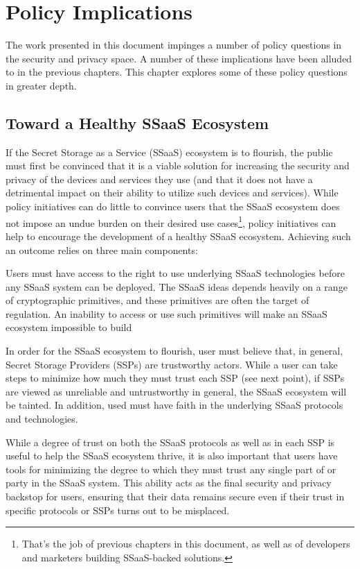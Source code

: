 \chapter{Policy Implications}
\label{chap:policy}

The work presented in this document impinges a number of policy
questions in the security and privacy space. A number of these
implications have been alluded to in the previous chapters. This
chapter explores some of these policy questions in greater depth.

\section{Toward a Healthy SSaaS Ecosystem}

If the Secret Storage as a Service (SSaaS) ecosystem is to flourish,
the public must first be convinced that it is a viable solution for
increasing the security and privacy of the devices and services they
use (and that it does not have a detrimental impact on their ability
to utilize such devices and services). While policy initiatives can do
little to convince users that the SSaaS ecosystem does not impose an
undue burden on their desired use cases\footnote{That's the job of
  previous chapters in this document, as well as of developers and
  marketers building SSaaS-backed solutions.}, policy initiatives can
help to encourage the development of a healthy SSaaS
ecosystem. Achieving such an outcome relies on three main components:

\begin{packed_desc}
\item[Availability of Cryptography:] Users must have access to the
  right to use underlying SSaaS technologies before any SSaaS system
  can be deployed. The SSaaS ideas depends heavily on a range of
  cryptographic primitives, and these primitives are often the target
  of regulation. An inability to access or use such primitives will
  make an SSaaS ecosystem impossible to build
\item[Maximizing SSP Trustworthiness:] In order for the SSaaS
  ecosystem to flourish, user must believe that, in general, Secret
  Storage Providers (SSPs) are trustworthy actors. While a user can
  take steps to minimize how much they must trust each SSP (see next
  point), if SSPs are viewed as unreliable and untrustworthy in
  general, the SSaaS ecosystem will be tainted. In addition, used must
  have faith in the underlying SSaaS protocols and technologies.
\item[Minimizing Mandatory Trust:] While a degree of trust on both the
  SSaaS protocols as well as in each SSP is useful to help the SSaaS
  ecosystem thrive, it is also important that users have tools for
  minimizing the degree to which they must trust any single part of or
  party in the SSaaS system. This ability acts as the final security
  and privacy backstop for users, ensuring that their data remains
  secure even if their trust in specific protocols or SSPs turns out
  to be misplaced.
\end{packed_desc}

